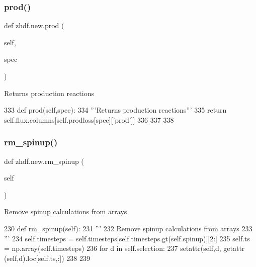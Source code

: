 \subsubsection{\texorpdfstring{prod()}{prod()}\hspace{0.1cm}{\footnotesize\ttfamily [2/2]}}
{\footnotesize\ttfamily def zhdf.\+new.\+prod (\begin{DoxyParamCaption}\item[{}]{self,  }\item[{}]{spec }\end{DoxyParamCaption})}

\begin{DoxyVerb}Returns production reactions\end{DoxyVerb}
 
\begin{DoxyCode}
333     \textcolor{keyword}{def }prod(self,spec):
334         \textcolor{stringliteral}{'''Returns production reactions'''}
335         \textcolor{keywordflow}{return} self.flux.columns[self.prodloss[spec][\textcolor{stringliteral}{'prod'}]]
336 
337 
338 
\end{DoxyCode}
\mbox{\label{classzhdf_1_1new_aae8beafb28be4540cbe8b7b90b9915fb}} 
\subsubsection{\texorpdfstring{rm\+\_\+spinup()}{rm\_spinup()}\hspace{0.1cm}{\footnotesize\ttfamily [1/2]}}
{\footnotesize\ttfamily def zhdf.\+new.\+rm\+\_\+spinup (\begin{DoxyParamCaption}\item[{}]{self }\end{DoxyParamCaption})}

\begin{DoxyVerb}Remove spinup calculations from arrays
\end{DoxyVerb}
 
\begin{DoxyCode}
230     \textcolor{keyword}{def }rm\_spinup(self):
231         \textcolor{stringliteral}{'''}
232 \textcolor{stringliteral}{        Remove spinup calculations from arrays}
233 \textcolor{stringliteral}{        '''}
234         self.timesteps = self.timesteps[self.timesteps.gt(self.spinup)][2:]
235         self.ts = np.array(self.timesteps)
236         \textcolor{keywordflow}{for} d \textcolor{keywordflow}{in} self.selection:
237             setattr(self,d, getattr (self,d).loc[self.ts,:])
238 
239 
\end{DoxyCode}
\mbox{\label{classzhdf_1_1new_aae8beafb28be4540cbe8b7b90b9915fb}} 
